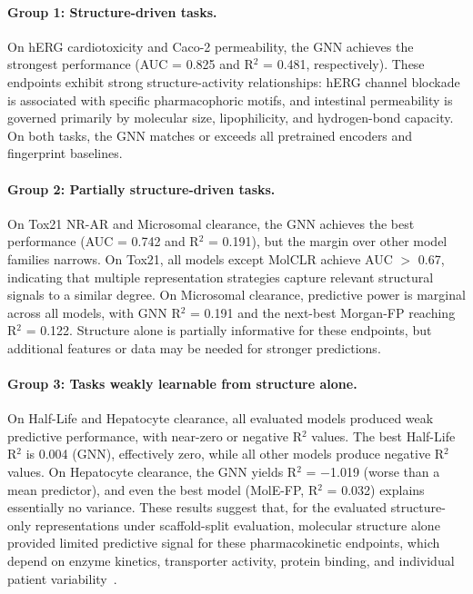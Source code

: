 \documentclass[journal]{IEEEtran}
\begin{document}
\paragraph{Group 1: Structure-driven tasks.}
On hERG cardiotoxicity and Caco-2 permeability, the GNN achieves the strongest performance (AUC = 0.825 and R$^2$ = 0.481, respectively). These endpoints exhibit strong structure-activity relationships: hERG channel blockade is associated with specific pharmacophoric motifs, and intestinal permeability is governed primarily by molecular size, lipophilicity, and hydrogen-bond capacity. On both tasks, the GNN matches or exceeds all pretrained encoders and fingerprint baselines.

\paragraph{Group 2: Partially structure-driven tasks.}
On Tox21 NR-AR and Microsomal clearance, the GNN achieves the best performance (AUC = 0.742 and R$^2$ = 0.191), but the margin over other model families narrows. On Tox21, all models except MolCLR achieve AUC $>$ 0.67, indicating that multiple representation strategies capture relevant structural signals to a similar degree. On Microsomal clearance, predictive power is marginal across all models, with GNN R$^2$ = 0.191 and the next-best Morgan-FP reaching R$^2$ = 0.122. Structure alone is partially informative for these endpoints, but additional features or data may be needed for stronger predictions.

\paragraph{Group 3: Tasks weakly learnable from structure alone.}
On Half-Life and Hepatocyte clearance, all evaluated models produced weak predictive performance, with near-zero or negative R$^2$ values. The best Half-Life R$^2$ is 0.004 (GNN), effectively zero, while all other models produce negative R$^2$ values. On Hepatocyte clearance, the GNN yields R$^2$ = $-$1.019 (worse than a mean predictor), and even the best model (MolE-FP, R$^2$ = 0.032) explains essentially no variance. These results suggest that, for the evaluated structure-only representations under scaffold-split evaluation, molecular structure alone provided limited predictive signal for these pharmacokinetic endpoints, which depend on enzyme kinetics, transporter activity, protein binding, and individual patient variability~\cite{obach1999prediction}.
\end{document}

